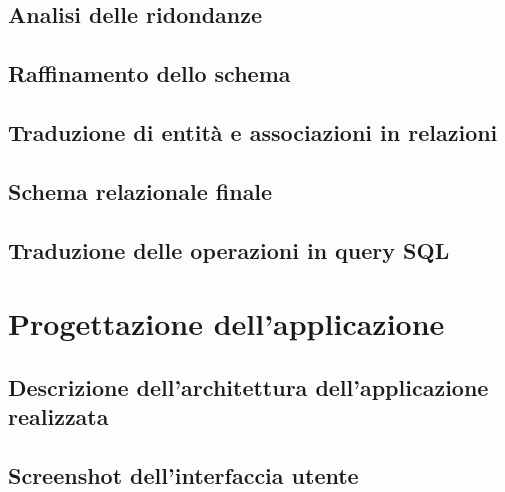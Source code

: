 \documentclass[12pt,a4paper]{report}
\begin{document}
\section{Analisi delle ridondanze}
\section{Raffinamento dello schema}
\section{Traduzione di entità e associazioni in relazioni}
\section{Schema relazionale finale}
\section{Traduzione delle operazioni in query SQL}

\chapter{Progettazione dell'applicazione}
\section{Descrizione dell'architettura dell'applicazione realizzata}
\section{Screenshot dell'interfaccia utente}
\end{document}

